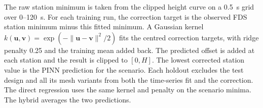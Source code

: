 The raw station minimum is taken from the clipped height curve on a 0.5~s grid over 0--120~s. For each training run, the correction target is the observed FDS station minimum minus this fitted minimum. A Gaussian kernel $k(\boldsymbol u,\boldsymbol v)=\exp(-\|\boldsymbol u-\boldsymbol v\|^2/2)$ fits the centred correction targets, with ridge penalty 0.25 and the training mean added back. The predicted offset is added at each station and the result is clipped to $[0,H]$. The lowest corrected station value is the PINN prediction for the scenario. Each holdout excludes the test design and all its mesh variants from both the time-series fit and the correction. The direct regression uses the same kernel and penalty on the scenario minima. The hybrid averages the two predictions.
